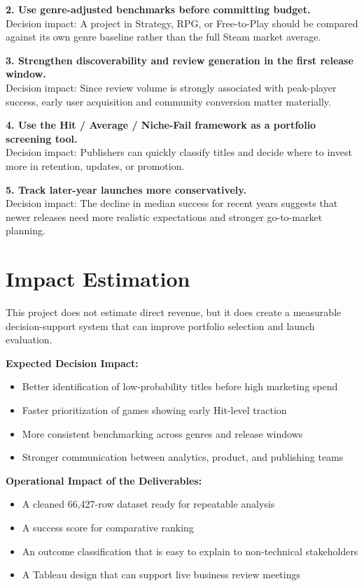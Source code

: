 \documentclass[12pt,a4paper]{report}
\begin{document}
\textbf{2. Use genre-adjusted benchmarks before committing budget.}\\
Decision impact: A project in Strategy, RPG, or Free-to-Play should be compared against its own genre baseline rather than the full Steam market average.

\textbf{3. Strengthen discoverability and review generation in the first release window.}\\
Decision impact: Since review volume is strongly associated with peak-player success, early user acquisition and community conversion matter materially.

\textbf{4. Use the Hit / Average / Niche-Fail framework as a portfolio screening tool.}\\
Decision impact: Publishers can quickly classify titles and decide where to invest more in retention, updates, or promotion.

\textbf{5. Track later-year launches more conservatively.}\\
Decision impact: The decline in median success for recent years suggests that newer releases need more realistic expectations and stronger go-to-market planning.

\chapter{Impact Estimation}

This project does not estimate direct revenue, but it does create a measurable decision-support system that can improve portfolio selection and launch evaluation.

\textbf{Expected Decision Impact:}
\begin{itemize}
\item Better identification of low-probability titles before high marketing spend
\item Faster prioritization of games showing early Hit-level traction
\item More consistent benchmarking across genres and release windows
\item Stronger communication between analytics, product, and publishing teams
\end{itemize}

\textbf{Operational Impact of the Deliverables:}
\begin{itemize}
\item A cleaned 66,427-row dataset ready for repeatable analysis
\item A success score for comparative ranking
\item An outcome classification that is easy to explain to non-technical stakeholders
\item A Tableau design that can support live business review meetings
\end{itemize}
\end{document}
